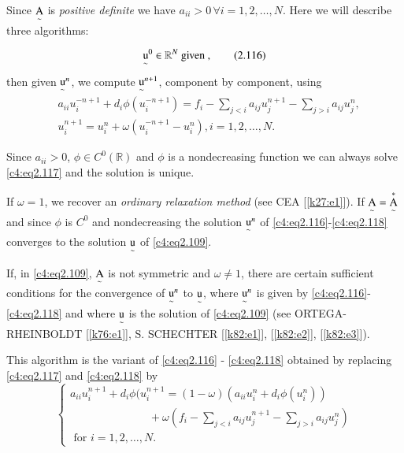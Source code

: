 Since $\operatorname*{A} \limits_\sim$ is \textit{positive definite} we have $a_{ii}
> 0\, \forall i=1, 2, \ldots, N$. Here we will describe three
algorithms: 

\begin{algorithm}\label{c4:alg1} %
\begin{equation}
{\operatorname*{u}\limits_\sim}^0 \in \mathbb{R}^N \text{ given },
\tag{2.116}\label{c4:eq2.116} 
\end{equation}
then given ${\operatorname*{u} \limits_\sim}^n$, we compute ${\operatorname*{u}
  \limits_\sim}^{n+1}$, component by component, using 
\begin{align}
& a_{ii}u_i^{-n+1} + d_i \phi (u_i^{-n+1}) = f_i - \sum_{j<i} a_{ij} u_j^{n+1} - \sum_{j  > i} a_{ij} u^n_j, \tag{2.117}\label{c4:eq2.117}\\
& u_i^{n+1} = u^n_i + \omega (u_i^{-n+1}-u^n_i), i=1, 2, \ldots, N. \tag{2.118}\label{c4:eq2.118}
\end{align}
\end{algorithm}

Since $a_{ii}>0$, $\phi \in C^0(\mathbb{R})$ and $\phi$ is a
nondecreasing function we can always solve \eqref{c4:eq2.117} and the
solution is unique. 

If $\omega =1$, we recover an \textit{ ordinary relaxation method}
(see CEA [\ref{k27:e1}]). If $\operatorname*{A} \limits _\sim = \operatorname*{A} \limits _\sim^*$ and since
$\phi$ is $C^0$ and nondecreasing the solution ${\operatorname*{u} \limits _\sim}^n$
of \eqref{c4:eq2.116}-\eqref{c4:eq2.118} converges to the solution
$\operatorname*{u} \limits _\sim$ of \eqref{c4:eq2.109}. 

If, in \eqref{c4:eq2.109}, $\operatorname*{A} \limits _\sim$ is not symmetric and
$\omega \neq 1$, there are certain sufficient conditions for the
convergence of ${\operatorname*{u} \limits _\sim}^n$ to $\operatorname*{u}\limits_\sim$, where
${\operatorname*{u}\limits _\sim}^n$ is given by \eqref{c4:eq2.116}-\eqref{c4:eq2.118}
and where $\operatorname*{u} \limits _\sim$ is the solution of \eqref{c4:eq2.109}
(see ORTEGA-RHEINBOLDT [\ref{k76:e1}], S. SCHECHTER [\ref{k82:e1}],
[\ref{k82:e2}], [\ref{k82:e3}]). 

\begin{algorithm}\label{c4:alg2} %
This algorithm is the variant of \eqref{c4:eq2.116} -
\eqref{c4:eq2.118} obtained by replacing \eqref{c4:eq2.117} and
\eqref{c4:eq2.118} by 
\begin{equation}
\begin{cases}
a_{ii}u_i^{n+1}+d_i \phi (u_i^{n+1} = (1- \omega) (a_{ii}u^n_i+d_i
\phi (u^n_i))\\ 
\hspace{3cm}+\omega(f_i - \sum\limits_{j<i}a_{ij}u_j^{n+1}-
\sum\limits_{j>i}a_{ij}u_j^n)\\ 
\text{ for } i=1,2, \ldots, N.
\end{cases}\tag{2.119}\label{c4:eq2.119}
\end{equation} 
 \end{algorithm}

